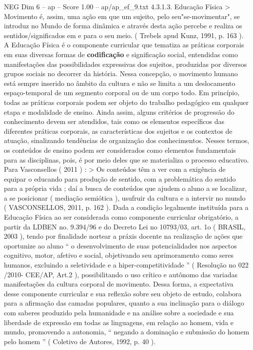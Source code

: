\begin{textsample}{NEG Dim 6 – ap – Score 1.00 – ap/ap\_ef\_9.txt}  \label{ex:f6_neg_183}
4.3.1.3.
Educação Física > Movimento é, assim, uma ação em que um sujeito, pelo seu"se-movimentar", se introduz no Mundo de forma dinâmica e através desta ação percebe e realiza os sentidos/significados em e para o seu meio. ( Trebels apud Kunz, 1991, p. 163 ).
A Educação Física é o componente curricular que tematiza as práticas corporais em suas diversas formas de \textbf{codificação} e significação social, entendidas como manifestações das possibilidades expressivas dos sujeitos, produzidas por diversos grupos sociais no decorrer da história.
Nessa concepção, o movimento humano está sempre inserido no âmbito da cultura e não se limita a um deslocamento espaço-temporal de um segmento corporal ou de um corpo todo.
Em princípio, todas as práticas corporais podem ser objeto do trabalho pedagógico em qualquer etapa e modalidade de ensino.
Ainda assim, alguns critérios de progressão do conhecimento devem ser atendidos, tais como os elementos específicos das diferentes práticas corporais, as características dos sujeitos e os contextos de atuação, sinalizando tendências de organização dos conhecimentos.
Nesses termos, os conteúdos de ensino podem ser considerados como elementos fundamentais para as disciplinas, pois, é por meio deles que se materializa o processo educativo.
Para Vasconsellos ( 2011 ) : > Os conteúdos têm a ver com a exigência de equipar o educando para produção de sentido, com a problemática do sentido para a própria vida ; daí a busca de conteúdos que ajudem o aluno a se localizar, a se posicionar ( mediação semiótica ), usufruir da cultura e a intervir no mundo ( VASCONSELLOS, 2011, p. 162 ).
Dada a condição legalmente instituída para a Educação Física ao ser considerada como componente curricular obrigatório, a partir da LDBEN no. 9.394/96 e do Decreto Lei no 10793/03, art. 1o ( BRASIL, 2003 ), tendo por finalidade nortear a práxis docente na realização de ações que oportunize ao aluno “ o desenvolvimento de suas potencialidades nos aspectos cognitivo, motor, afetivo e social, objetivando seu aprimoramento como seres humanos, excluindo a seletividade e a hiper-competitividade ” ( Resolução no 022 /2010- CEE/AP, Art.2 ), possibilitando o uso crítico e autônomo das variadas manifestações da cultura corporal de movimento.
Dessa forma, a expectativa desse componente curricular e sua reflexão sobre seu objeto de estudo, colabora para a afirmação das camadas populares, quanto a sua inclinação para o diálogo com saberes produzido pela humanidade e na análise sobre a sociedade e sua liberdade de expressão em todas as linguagens, em relação ao homem, vida e mundo, promovendo a autonomia, “ negando a dominação e submissão do homem pelo homem ” ( Coletivo de Autores, 1992, p. 40 ).

\end{textsample}
